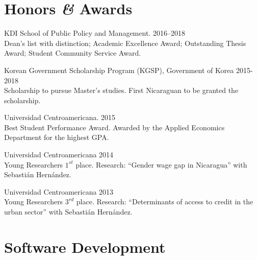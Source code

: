 \documentclass[a4paper, 10pt]{article}
\renewenvironment{itemize}{
  \begin{list}{}
    { \setlength{\itemsep}{5pt}
      \setlength{\parsep}{0pt}
      \setlength{\topsep}{0pt}
      \setlength{\leftmargin}{0em} } }{
  \end{list}}
\begin{document}

\section*{Honors \textit{\&} Awards}
\begin{itemize}
\item KDI School of Public Policy and Management. \hfill 2016--2018 \\ {\small Dean's list with distinction; Academic Excellence Award; Outstanding Thesis Award; Student Community Service Award.}
\item Korean Government Scholarship Program (KGSP), Government of Korea \hfill 2015-2018 \\ {\small Scholarship to pursue Master's studies. First Nicaraguan to be granted the scholarship.}
\item Universidad Centroamericana. \hfill 2015 \\ {\small  Best Student Performance Award. Awarded by the Applied Economics Department for the highest GPA.}
\item Universidad Centroamericana \hfill 2014 \\ {\small Young Researchers $1^{st}$ place. Research: ``Gender wage gap in Nicaragua'' with Sebastián Hernández.}
\item Universidad Centroamericana \hfill 2013 \\ {\small Young Researchers $3^{rd}$ place. Research: ``Determinants of access to credit in the urban sector'' with Sebastián Hernández. }
\end{itemize}


\section*{Software Development}
\end{document}
